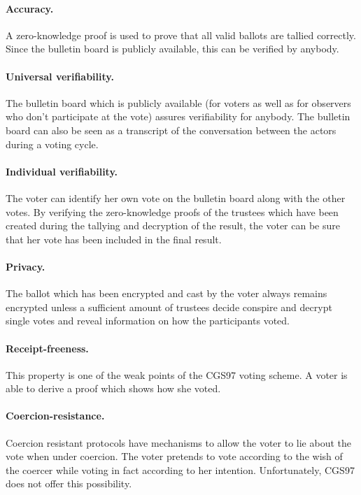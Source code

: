 \documentclass[numbers=noenddot, abstract=on, a4paper, headsepline,
footsepline, oneside, draft=off]{scrreprt}
\begin{document}
\paragraph{Accuracy.} A zero-knowledge proof is used to prove that all valid
ballots are tallied correctly. Since the bulletin board is publicly available,
this can be verified by anybody.

\paragraph{Universal verifiability.} The bulletin board which is publicly
available (for voters as well as for observers who don't participate at the
vote) assures verifiability for anybody. The bulletin board can also
be seen as a transcript of the conversation between the actors during a voting
cycle. 

\paragraph{Individual verifiability.} The voter can identify her own vote on
the bulletin board along with the other votes. By verifying the zero-knowledge
proofs of the trustees which have been created during the tallying and
decryption of the result, the voter can be sure that her vote has been included
in the final result.

\paragraph{Privacy.} The ballot which has been encrypted and cast by the
voter always remains encrypted unless a sufficient amount of trustees decide
conspire and decrypt single votes and reveal information on how the participants
voted.

\paragraph{Receipt-freeness.} This property is one of the weak points of the
CGS97 voting scheme. A voter is able to derive a proof which shows how she
voted.

\paragraph{Coercion-resistance.} Coercion resistant protocols have mechanisms
to allow the voter to lie about the vote when under coercion. The voter pretends
to vote according to the wish of the coercer while voting in fact according to
her intention. Unfortunately, CGS97 does not offer this possibility.
\end{document}
